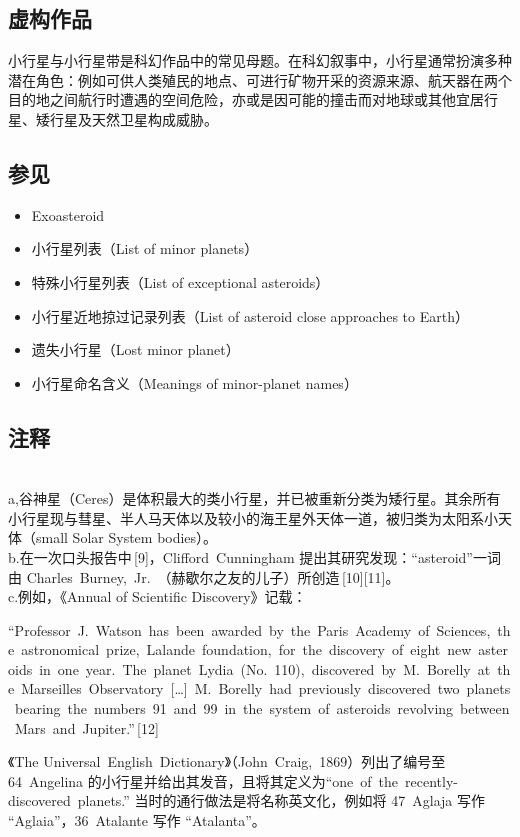 \subsection{虚构作品}  
小行星与小行星带是科幻作品中的常见母题。在科幻叙事中，小行星通常扮演多种潜在角色：例如可供人类殖民的地点、可进行矿物开采的资源来源、航天器在两个目的地之间航行时遭遇的空间危险，亦或是因可能的撞击而对地球或其他宜居行星、矮行星及天然卫星构成威胁。\,
\subsection{参见}  
\begin{itemize}
\item Exoasteroid  
\item 小行星列表（List of minor planets）  
\item 特殊小行星列表（List of exceptional asteroids）  
\item 小行星近地掠过记录列表（List of asteroid close approaches to Earth）  
\item 遗失小行星（Lost minor planet）  
\item 小行星命名含义（Meanings of minor-planet names）
\end{itemize}
\subsection{注释}\\
a,谷神星（Ceres）是体积最大的类小行星，并已被重新分类为矮行星。其余所有小行星现与彗星、半人马天体以及较小的海王星外天体一道，被归类为太阳系小天体（small Solar System bodies）。\\
b.在一次口头报告中\,[9]，Clifford~Cunningham 提出其研究发现：“asteroid”一词由 Charles~Burney,~Jr.\ （赫歇尔之友的儿子）所创造\,[10][11]。\\
c.例如，《Annual of Scientific Discovery》记载：

``Professor~J.~Watson~has~been~awarded~by~the~Paris~Academy~of~Sciences,~the~astronomical~prize,~Lalande~foundation,~for~the~discovery~of~eight~new~asteroids~in~one~year.~The~planet~Lydia~(No.~110),~discovered~by~M.~Borelly~at~the~Marseilles~Observatory~[\dots]~M.~Borelly~had~previously~discovered~two~planets~bearing~the~numbers~91~and~99~in~the~system~of~asteroids~revolving~between~Mars~and~Jupiter.''\,[12]

《The Universal~English~Dictionary》（John~Craig,~1869）列出了编号至 64~Angelina 的小行星并给出其发音，且将其定义为“one~of~the~recently-discovered~planets.” 当时的通行做法是将名称英文化，例如将 47~Aglaja 写作 “Aglaia”，36~Atalante 写作 “Atalanta”。

